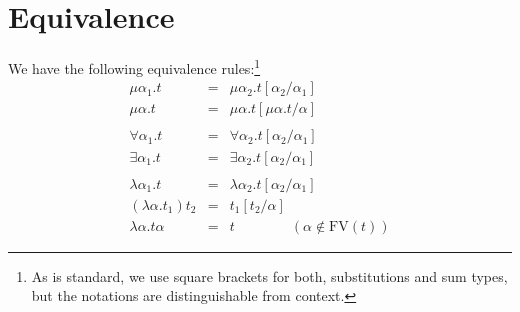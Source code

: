 \documentclass[twoside]{article}
\newcommand{\f}[1]{\mbox{#1}}
\begin{document}
\section{Equivalence}
\label{coreequiv}

We have the following equivalence rules:\footnote{As is standard, we use square brackets for both, substitutions and sum types, but the notations are distinguishable from context.}
\begin{eqnarray}
\label{mualpha} \mu \alpha_1.t &=& \mu \alpha_2.t[\alpha_2/\alpha_1] \\
\label{mushao}  \mu \alpha.t &=& \mu \alpha.t[\mu \alpha.t/\alpha] \\
\nonumber\\
\label{forallalpha}\forall \alpha_1.t &=& \forall \alpha_2.t[\alpha_2/\alpha_1] \\
\label{existsalpha} \exists \alpha_1.t &=& \exists \alpha_2.t[\alpha_2/\alpha_1] \\
\nonumber\\
\label{lambdaalpha} \lambda \alpha_1.t &=& \lambda \alpha_2.t[\alpha_2/\alpha_1] \\
\label{lambdabeta}  (\lambda \alpha.t_1) t_2 &=& t_1[t_2/\alpha] \\
\label{lambdaeta}   \lambda \alpha.t \alpha &=& t \qquad\qquad (\alpha\notin\f{FV}(t))
\end{eqnarray}
\end{document}
